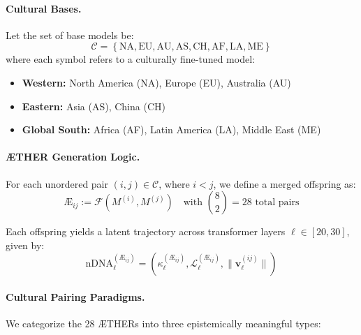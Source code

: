 \paragraph{\textbf{Cultural Bases.}} Let the set of base models be:
\[
\mathcal{C} = \left\{ \text{NA}, \text{EU}, \text{AU}, \text{AS}, \text{CH}, \text{AF}, \text{LA}, \text{ME} \right\}
\]
where each symbol refers to a culturally fine-tuned model:
\begin{itemize}[leftmargin=1.5em]
    \item \textbf{Western:} North America (NA), Europe (EU), Australia (AU)
    \item \textbf{Eastern:} Asia (AS), China (CH)
    \item \textbf{Global South:} Africa (AF), Latin America (LA), Middle East (ME)
\end{itemize}

\paragraph{\textbf{ÆTHER Generation Logic.}} For each unordered pair \( (i, j) \in \mathcal{C} \), where \( i < j \), we define a merged offspring as:
\[
\text{Æ}_{ij} := \mathcal{F}\left( M^{(i)}, M^{(j)} \right)
\quad \text{with } \binom{8}{2} = 28 \text{ total pairs}
\]

Each offspring yields a latent trajectory across transformer layers \( \ell \in [20, 30] \), given by:
\[
\text{nDNA}^{(\text{Æ}_{ij})}_\ell = \left( \kappa^{(\text{Æ}_{ij})}_\ell, \mathcal{L}^{(\text{Æ}_{ij})}_\ell, \| \mathbf{v}_\ell^{(ij)} \| \right)
\]

\paragraph{\textbf{Cultural Pairing Paradigms.}} We categorize the 28 ÆTHERs into three epistemically meaningful types:

